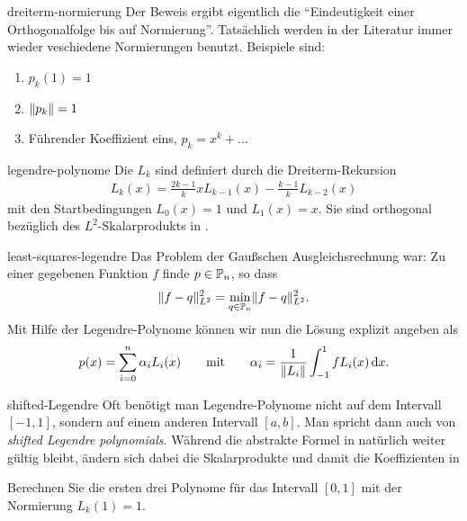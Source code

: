 \begin{Bemerkung}{dreiterm-normierung}
  Der Beweis ergibt eigentlich die ``Eindeutigkeit einer
  Orthogonalfolge bis auf Normierung''. Tatsächlich werden in der
  Literatur immer wieder veschiedene Normierungen benutzt. Beispiele
  sind:
  \begin{enumerate}
  \item $p_k(1) = 1$
  \item $\norm{p_k} = 1$
  \item Führender Koeffizient eins, $p_k = x^k + \dots$
  \end{enumerate}
\end{Bemerkung}

\begin{Definition}{legendre-polynome}
  Die  $L_k$ sind definiert durch
  die Dreiterm-Rekursion
  \begin{gather}
    L_{k}(x) = \tfrac{2k-1}{k}x L_{k-1}(x) - \tfrac{k-1}{k} L_{k-2}(x)
  \end{gather}
  mit den Startbedingungen $L_0(x) = 1$ und $L_1(x) = x$.
  Sie sind orthogonal bezüglich des $L^2$-Skalarprodukts in
  .
\end{Definition}

\begin{Beispiel}{least-squares-legendre}
  Das Problem der Gaußschen Ausgleichsrechnung war: Zu einer gegebenen
  Funktion $f$ finde $p\in \P_n$, so dass
  \begin{gather}
    \norm{f-q}_{L^2}^2
    = \min_{q\in\P_n} \norm{f-q}_{L^2}^2.
  \end{gather}
  Mit Hilfe der Legendre-Polynome können wir nun die Lösung explizit angeben als
  \begin{gather}
    p(x) = \sum_{i=0}^n \alpha_i L_i(x)
    \qquad\text{mit}\qquad
    \alpha_i = \frac1{\norm{L_i}}\int_{-1}^1 f L_i(x)\dx.
  \end{gather}
\end{Beispiel}

\begin{Aufgabe}{shifted-Legendre}
  Oft benötigt man Legendre-Polynome nicht auf dem Intervall $[-1,1]$,
  sondern auf einem anderen Intervall $[a,b]$. Man spricht dann auch
  von \emph{shifted Legendre polynomials}. Während die abstrakte
  Formel in  natürlich weiter gültig bleibt,
  ändern sich dabei die Skalarprodukte und damit die Koeffizienten in

  Berechnen Sie die ersten drei Polynome für das Intervall $[0,1]$ mit
  der Normierung $L_k(1) = 1$.
\end{Aufgabe}

